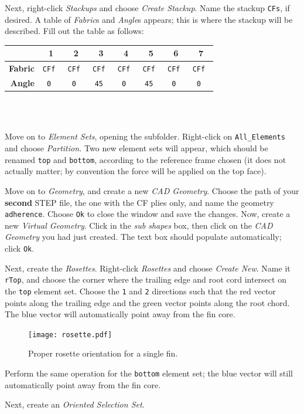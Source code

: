 \documentclass{amsdtx}
\begin{document}
\begin{multicols}{2}
Next, right-click \textit{Stackups} and choose \textit{Create Stackup}. Name the stackup \verb|CFs|, if desired. A table of \textit{Fabric}s and \textit{Angle}s appears; this is where the stackup will be described. Fill out the table as follows:~\\[-2em]
\begin{table}[H]
\centering
\renewcommand{\arraystretch}{1.4}
\begin{tabular}{r|c|c|c|c|c|c|c|}
& 1 & 2 & 3 & 4 & 5 & 6 & 7\\\hline\hline
\bf Fabric & \tt CFf & \tt CFf & \tt CFf & \tt CFf & \tt CFf & \tt CFf & \tt CFf \\\hline
\bf Angle & \tt 0 &\tt 0 &\tt 45 &\tt 0 &\tt 45 &\tt 0 &\tt 0 \\\hline
\end{tabular}
\end{table}
~\\[-3em]
\end{multicols}
~\\[-3em]Move on to \textit{Element Sets}, opening the subfolder. Right-click on \verb|All_Elements| and choose \textit{Partition.} Two new element sets will appear, which should be renamed \verb|top| and \verb|bottom|, according to the reference frame chosen (it does not actually matter; by convention the force will be applied on the top face). 

Move on to \textit{Geometry}, and create a new \textit{CAD Geometry}. Choose the path of your \textbf{second} STEP file, the one with the CF plies only, and name the geometry \verb|adherence|. Choose \verb|Ok| to close the window and save the changes. Now, create a new \textit{Virtual Geometry}. Click in the \textit{sub shapes} box, then click on the \textit{CAD Geometry} you had just created. The text box should populate automatically; click \verb|Ok|.

Next, create the \textit{Rosettes}. Right-click \textit{Rosettes} and choose \textit{Create New}. Name it \verb|rTop|, and choose the corner where the trailing edge and root cord intersect on the \verb|top| element set. Choose the \verb|1| and \verb|2| directions such that the {\color{red} red} vector points along the trailing edge and the {\color{Green} green} vector points along the root chord. The {\color{blue} blue} vector will automatically point away from the fin core.
\begin{figure}[H]
\centering
\texttt{[image: rosette.pdf]}
\caption{Proper rosette orientation for a single fin.}	
\end{figure}
\noindent Perform the same operation for the \verb|bottom| element set; the {\color{blue} blue} vector will still automatically point away from the fin core.

Next, create an \textit{Oriented Selection Set}.
\end{document}
